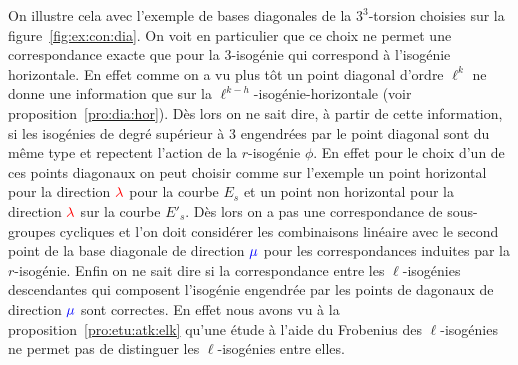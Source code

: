 \documentclass[10pt,a4paper]{book}
\theoremstyle{plain}
\theoremstyle{definition}
\theoremstyle{definition}
\theoremstyle{definition}
\theoremstyle{definition}
\theoremstyle{remark}
\theoremstyle{remark}
\theoremstyle{definition}
\begin{document}
On illustre cela avec l'exemple de bases diagonales de la $3^3$-torsion 
choisies sur la figure~\ref{fig:ex:con:dia}. On voit en 
particulier que ce choix ne permet une correspondance exacte que pour la 
$3$-isogénie qui correspond à l'isogénie horizontale. En effet comme on a vu
plus tôt un point diagonal d'ordre $\ell^k$ ne donne une information que sur la
$\ell^{k-h}$-isogénie-horizontale (voir proposition~\ref{pro:dia:hor}). Dès 
lors on ne sait dire, à partir de cette information, si les isogénies de degré 
supérieur à $3$ engendrées par le point diagonal sont du même type et repectent
l'action de la $r$-isogénie $\phi$. En effet pour le choix d'un de ces points 
diagonaux on peut choisir comme sur l'exemple un point horizontal pour la 
direction $\color{red} \lambda$ pour la courbe $E_s$ et un point non horizontal
pour la direction $ \color{red} \lambda$ sur la courbe $E'_s$.  Dès lors on a 
pas une correspondance de sous-groupes cycliques et l'on doit considérer les 
combinaisons linéaire avec le second point de la base diagonale de direction 
$\color{blue} \mu$ pour les correspondances induites par la $r$-isogénie. Enfin
on ne sait dire si la correspondance entre les $\ell$-isogénies descendantes 
qui composent l'isogénie engendrée par les points de dagonaux de direction 
$\color{blue}{\mu}$ sont correctes. En effet nous avons vu à la 
proposition~\ref{pro:etu:atk:elk} qu'une étude à l'aide du Frobenius des 
$\ell$-isogénies ne permet pas de distinguer les $\ell$-isogénies entre elles.
\end{document}
